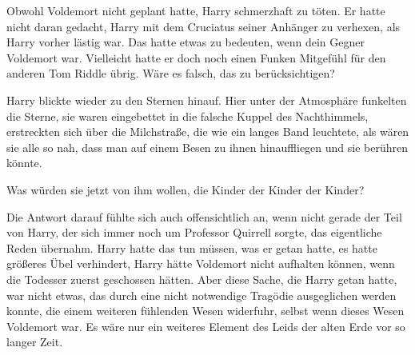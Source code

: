 Obwohl Voldemort nicht geplant hatte, Harry schmerzhaft zu töten. Er hatte nicht daran gedacht, Harry mit dem Cruciatus seiner Anhänger zu verhexen, als Harry vorher lästig war. Das hatte etwas zu bedeuten, wenn dein Gegner Voldemort war. Vielleicht hatte er doch noch einen Funken Mitgefühl für den anderen Tom Riddle übrig.
Wäre es falsch, das zu berücksichtigen?

Harry blickte wieder zu den Sternen hinauf. Hier unter der Atmosphäre funkelten die Sterne, sie waren eingebettet in die falsche Kuppel des Nachthimmels, erstreckten sich über die Milchstraße, die wie ein langes Band leuchtete, als wären sie alle so nah, dass man auf einem Besen zu ihnen hinauffliegen und sie berühren könnte.

Was würden sie jetzt von ihm wollen, die Kinder der Kinder der Kinder?

Die Antwort darauf fühlte sich auch offensichtlich an, wenn nicht gerade der Teil von Harry, der sich immer noch um Professor Quirrell sorgte, das eigentliche Reden übernahm.
Harry hatte das tun müssen, was er getan hatte, es hatte größeres Übel verhindert, Harry hätte Voldemort nicht aufhalten können, wenn die Todesser zuerst geschossen hätten. Aber diese Sache, die Harry getan hatte, war nicht etwas, das durch eine nicht notwendige Tragödie ausgeglichen werden konnte, die einem weiteren fühlenden Wesen widerfuhr, selbst wenn dieses Wesen Voldemort war. Es wäre nur ein weiteres Element des Leids der alten Erde vor so langer Zeit.

